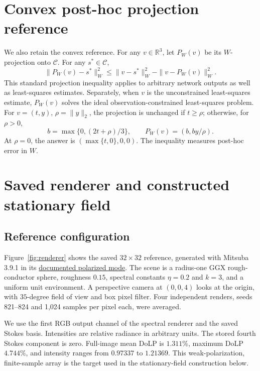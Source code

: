 \documentclass[10pt,a4paper]{article}
\begin{document}
\section{Convex post-hoc projection reference}
We also retain the convex reference. For any $v\in\mathbb R^3$, let $P_W(v)$ be its $W$-projection onto $\mathcal C$. For any $s^*\in\mathcal C$,
\begin{equation}
 \|P_W(v)-s^*\|_W^2\leq\|v-s^*\|_W^2-\|v-P_W(v)\|_W^2.
 \label{eq:projbound}
\end{equation}
This standard projection inequality \cite{supp-prox} applies to arbitrary network outputs as well as least-squares estimates. Separately, when $v$ is the unconstrained least-squares estimate, $P_W(v)$ solves the ideal observation-constrained least-squares problem. For $v=(t,y)$, $\rho=\|y\|_2$, the projection is unchanged if $t\geq\rho$; otherwise, for $\rho>0$,
\begin{equation}
 b=\max\{0,(2t+\rho)/3\},\qquad P_W(v)=(b,by/\rho).
 \label{eq:weightedprojection}
\end{equation}
At $\rho=0$, the answer is $(\max\{t,0\},0,0)$. The inequality measures post-hoc error in $W$.


\section{Saved renderer and constructed stationary field}
\subsection{Reference configuration}
Figure~\ref{fig:renderer} shows the saved $32\times32$ reference, generated with Mitsuba 3.9.1 in its \href{https://mitsuba.readthedocs.io/en/latest/src/rendering/polarized_rendering.html}{documented polarized mode}. The scene is a radius-one GGX rough-conductor sphere, roughness $0.15$, spectral constants $\eta=0.2$ and $k=3$, and a uniform unit environment. A perspective camera at $(0,0,4)$ looks at the origin, with $35$-degree field of view and box pixel filter. Four independent renders, seeds 821--824 and 1,024 samples per pixel each, were averaged.

We use the first RGB output channel of the spectral renderer and the saved Stokes basis. Intensities are relative radiance in arbitrary units. The stored fourth Stokes component is zero. Full-image mean DoLP is $1.311\%$, maximum DoLP $4.744\%$, and intensity ranges from $0.97337$ to $1.21369$. This weak-polarization, finite-sample array is the target used in the stationary-field construction below.
\end{document}
